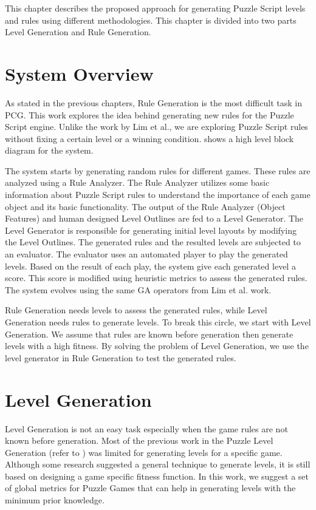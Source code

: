 This chapter describes the proposed approach for generating Puzzle Script levels and rules using different methodologies. This chapter is divided into two parts Level Generation and Rule Generation.

\section{System Overview}
As stated in the previous chapters, Rule Generation is the most difficult task in PCG. This work explores the idea behind generating new rules for the Puzzle Script engine. Unlike the work by Lim et al.\cite{puzzleScriptGeneration}, we are exploring Puzzle Script rules without fixing a certain level or a winning condition.  shows a high level block diagram for the system.


The system starts by generating random rules for different games. These rules are analyzed using a Rule Analyzer. The Rule Analyzer utilizes some basic information about Puzzle Script rules to understand the importance of each game object and its basic functionality. The output of the Rule Analyzer (Object Features) and human designed Level Outlines are fed to a Level Generator. The Level Generator is responsible for generating initial level layouts by modifying the Level Outlines. The generated rules and the resulted levels are subjected to an evaluator. The evaluator uses an automated player to play the generated levels. Based on the result of each play, the system give each generated level a score. This score is modified using heuristic metrics to assess the generated rules. The system evolves using the same GA operators from Lim et al. work\cite{puzzleScriptGeneration}.\\\par

Rule Generation needs levels to assess the generated rules, while Level Generation needs rules to generate levels. To break this circle, we start with Level Generation. We assume that rules are known before generation then generate levels with a high fitness. By solving the problem of Level Generation, we use the level generator in Rule Generation to test the generated rules.

\section{Level Generation}
Level Generation is not an easy task especially when the game rules are not known before generation. Most of the previous work in the Puzzle Level Generation (refer to ) was limited for generating levels for a specific game. Although some research suggested a general technique to generate levels, it is still based on designing a game specific fitness function. In this work, we suggest a set of global metrics for Puzzle Games that can help in generating levels with the minimum prior knowledge.\\\par

